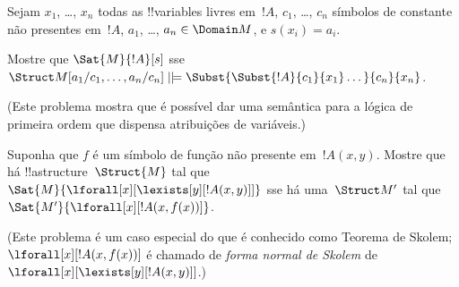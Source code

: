 \documentclass[../../../include/open-logic-section]{subfiles}
\begin{document}
\begin{prob}
\begin{enumerate}
\end{enumerate}
Sejam $x_1$, \dots, $x_n$ todas as !!{variable}s livres em~$!A$,
$c_1$, \dots, $c_n$ símbolos de constante não presentes em~$!A$,
$a_1$, \dots, $a_n \in \Domain M$, e $s(x_i) = a_i$.

Mostre que $\Sat{M}{!A}[s]$ sse $\Struct M[a_1/c_1,\dots,a_n/c_n]
\VDash \Subst{\Subst{!A}{c_1}{x_1}\dots}{c_n}{x_n}$.

(Este problema mostra que é possível dar uma semântica para a
lógica de primeira ordem que dispensa atribuições de variáveis.)
\end{prob}

\begin{prob}
Suponha que $f$ é um símbolo de função não presente em~$!A(x,y)$. Mostre que
há !!a{structure}~$\Struct{M}$ tal que
$\Sat{M}{\lforall[x][\lexists[y][!A(x,y)]]}$ sse há uma~$\Struct
M'$ tal que $\Sat{M'}{\lforall[x][!A(x,f(x))]}$.

(Este problema é um caso especial do que é conhecido como Teorema de Skolem;
$\lforall[x][!A(x,f(x))]$ é chamado de \emph{forma normal de Skolem} de
$\lforall[x][\lexists[y][!A(x,y)]]$.)
\end{prob}
\end{document}
